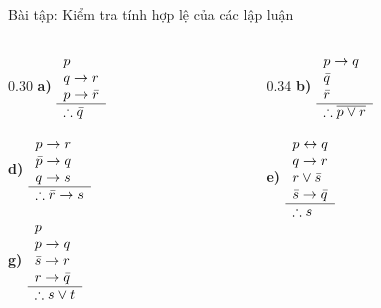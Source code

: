 \documentclass[aspectratio=169, 11pt]{beamer}
\begin{document}
\begin{frame}{Bài tập: Kiểm tra tính hợp lệ của các lập luận}
\begin{columns}[t, onlytextwidth]
  \begin{column}{0.30\textwidth}
    \small
    \textbf{a)}\; $\begin{array}[c]{l}
      p \\
      q \rightarrow r \\
      p \rightarrow \bar{r} \\
      \hline
      \therefore \bar{q}
    \end{array}$

    \vspace{0.35cm}
    \textbf{d)}\; $\begin{array}[c]{l}
      p \rightarrow r \\
      \bar{p} \rightarrow q \\
      q \rightarrow s \\
      \hline
      \therefore \bar{r} \rightarrow s
    \end{array}$

    \vspace{0.35cm}
    \textbf{g)}\; $\begin{array}[c]{l}
      p \\
      p \rightarrow q \\
      \bar{s} \rightarrow r \\
      r \rightarrow \bar{q} \\
      \hline
      \therefore s \lor t
    \end{array}$
  \end{column}
  \begin{column}{0.34\textwidth}
    \small
    \textbf{b)}\; $\begin{array}[c]{l}
      p \rightarrow q \\
      \bar{q} \\
      \bar{r} \\
      \hline
      \therefore \overline{p \lor r}
    \end{array}$

    \vspace{0.25cm}
    \textbf{e)}\; $\begin{array}[c]{l}
      p \leftrightarrow q \\
      q \rightarrow r \\
      r \lor \bar{s} \\
      \bar{s} \rightarrow \bar{q} \\
      \hline
      \therefore s
    \end{array}$


\end{column}
\end{columns}
\end{frame}
\end{document}
